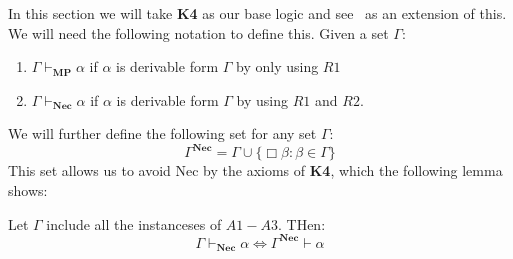 \documentclass[../main.tex]{subfiles}
\begin{document}
In this section we will take \textbf{K4} as our base logic and see \GL\  as an
extension of this.
We will need the following notation to
define this. Given a set $\Gamma$:
\begin{enumerate}
	\item $\Gamma\vdash_{\textbf{MP}}\alpha$ if $\alpha$ is derivable form $\Gamma$ by
		only using $R1$
	\item $\Gamma\vdash_{\textbf{Nec}}\alpha$ if $\alpha$ is derivable form $\Gamma$ by
		using $R1$ and $R2$.
\end{enumerate}
We will further define the following set for any set $\Gamma$:
\[
	\Gamma^{\textbf{Nec}}=\Gamma\cup\{\Box\beta:\beta\in\Gamma\}
\]
This set allows us to avoid Nec by the axioms of \textbf{K4}, which the
following lemma shows:
\begin{lem}
	Let $\Gamma$ include all the instanceses of $A1-A3$. THen:
	\[
		\Gamma\vdash_{\textbf{Nec}}\alpha\Leftrightarrow\Gamma^{\textbf{Nec}}\vdash\alpha
	\]
\end{lem}
\end{document}
